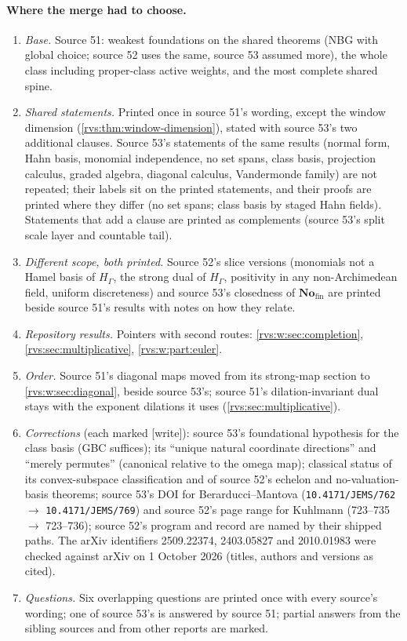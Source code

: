 \documentclass[11pt,letterpaper]{article}
\numberwithin{equation}{section}
\theoremstyle{definition}
\theoremstyle{remark}
\newcommand{\No}{\mathbf{No}}
\newcommand{\Fin}{\No_{\mathrm{fin}}}
\newcommand{\wtag}{\textup{[write]}}%
\begin{document}
\paragraph{Where the merge had to choose.}
\begin{enumerate}
\item \emph{Base.} Source 51: weakest foundations on the shared theorems
(NBG with global choice; source 52 uses the same, source 53 assumed more),
the whole class including proper-class active weights, and the most
complete shared spine.
\item \emph{Shared statements.}  Printed once in source 51's wording, except
the window dimension (\cref{rvs:thm:window-dimension}), stated with source
53's two additional clauses.  Source 53's statements of the same results
(normal form, Hahn basis, monomial independence, no set spans, class basis,
projection calculus, graded algebra, diagonal calculus, Vandermonde family)
are not repeated; their labels sit on the printed statements, and their
proofs are printed where they differ (no set spans; class basis by staged
Hahn fields).  Statements that add a clause are printed as complements
(source 53's split scale layer and countable tail).
\item \emph{Different scope, both printed.}  Source 52's slice versions
(monomials not a Hamel basis of \(H_\Gamma\), the strong dual of \(H_\Gamma\),
positivity in any non-Archimedean field, uniform discreteness) and source
53's closedness of \(\Fin\) are printed beside source 51's results with notes
on how they relate.
\item \emph{Repository results.}  Pointers with second routes:
\cref{rvs:w:sec:completion}, \cref{rvs:sec:multiplicative},
\cref{rvs:w:part:euler}.
\item \emph{Order.}  Source 51's diagonal maps moved from its strong-map
section to \cref{rvs:w:sec:diagonal}, beside source 53's; source 51's
dilation-invariant dual stays with the exponent dilations it uses
(\cref{rvs:sec:multiplicative}).
\item \emph{Corrections} (each marked \wtag{}): source 53's foundational
hypothesis for the class basis (GBC suffices); its ``unique natural
coordinate directions'' and ``merely permutes'' (canonical relative to the
omega map); classical status of its convex-subspace classification and of
source 52's echelon and no-valuation-basis theorems; source 53's DOI for
Berarducci--Mantova (\texttt{10.4171/JEMS/762} \(\to\) \texttt{10.4171/JEMS/769})
and source 52's page range for Kuhlmann (723--735 \(\to\) 723--736); source
52's program and record are named by their shipped paths.  The arXiv
identifiers 2509.22374, 2403.05827 and 2010.01983 were checked against arXiv
on 1 October 2026 (titles, authors and versions as cited).
\item \emph{Questions.}  Six overlapping questions are printed once with
every source's wording; one of source 53's is answered by source 51; partial
answers from the sibling sources and from other reports are marked.
\end{enumerate}
\end{document}
